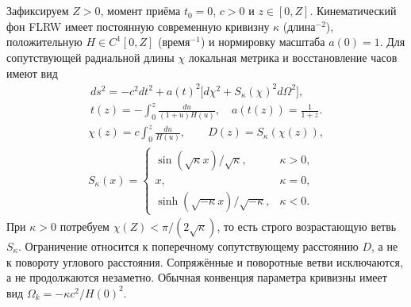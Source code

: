 \section{}\label{sec:carrier}
{Зафиксируем $Z>0$, момент приёма $t_0=0$, $c>0$ и $z\in[0,Z]$. Кинематический фон FLRW имеет постоянную современную кривизну $\kappa$ (длина$^{-2}$), положительную $H\in C^1[0,Z]$ (время$^{-1}$) и нормировку масштаба $a(0)=1$. Для сопутствующей радиальной длины $\chi$ локальная метрика и восстановление часов имеют вид}
\begin{equation}\label{eq:metric}
 \begin{gathered}
 ds^2=-c^2dt^2+a(t)^2\bigl[d\chi^2+S_\kappa(\chi)^2d\Omega^2\bigr],\\
 t(z)=-\int_0^z\frac{du}{(1+u)H(u)},\quad a(t(z))=\frac1{1+z}.
 \end{gathered}
\end{equation}
\begin{equation}\label{eq:distance}
 \begin{gathered}
 \chi(z)=c\int_0^z\frac{du}{H(u)},\qquad D(z)=S_\kappa(\chi(z)),\\
 S_\kappa(x)=\begin{cases}
 \sin(\sqrt\kappa x)/\sqrt\kappa,&\kappa>0,\\
 x,&\kappa=0,\\
 \sinh(\sqrt{-\kappa}x)/\sqrt{-\kappa},&\kappa<0.
 \end{cases}
 \end{gathered}
\end{equation}
{При $\kappa>0$ потребуем $\chi(Z)<\pi/(2\sqrt\kappa)$, то есть строго возрастающую ветвь $S_\kappa$. Ограничение относится к поперечному сопутствующему расстоянию $D$, а не к повороту углового расстояния. Сопряжённые и поворотные ветви исключаются, а не продолжаются незаметно. Обычная конвенция параметра кривизны имеет вид $\Omega_k=-\kappa c^2/H(0)^2$.}
